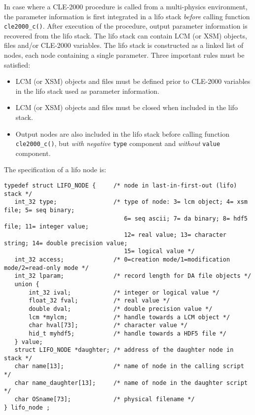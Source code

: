 \vskip 0.08cm

In case where a CLE-2000 procedure is called from a multi-physics environment, the parameter information is first integrated in a lifo stack {\sl before} calling
function {\tt cle2000\_c()}. After execution of the procedure, output parameter information is recovered from the lifo stack. The lifo stack can contain LCM (or XSM) objects, files and/or CLE-2000 variables. The lifo stack is constructed as a linked list of nodes, each node containing a single parameter. Three important rules must be satisfied:
\begin{itemize}
\item LCM (or XSM) objects and files must be defined prior to CLE-2000 variables in the lifo stack used as parameter information.
\item LCM (or XSM) objects and files must be closed when included in the lifo stack.
\item Output nodes are also included in the lifo stack before calling function {\tt cle2000\_c()}, but {\sl with negative} {\tt type} component and {\sl without} {\tt value} component.
\end{itemize}

\vskip 0.08cm

The specification of a lifo node is:

\small
\begin{verbatim}
typedef struct LIFO_NODE {     /* node in last-in-first-out (lifo) stack */
   int_32 type;                /* type of node: 3= lcm object; 4= xsm file; 5= seq binary;
                                  6= seq ascii; 7= da binary; 8= hdf5 file; 11= integer value;
                                  12= real value; 13= character string; 14= double precision value;
                                  15= logical value */
   int_32 access;              /* 0=creation mode/1=modification mode/2=read-only mode */
   int_32 lparam;              /* record length for DA file objects */
   union {
       int_32 ival;            /* integer or logical value */
       float_32 fval;          /* real value */
       double dval;            /* double precision value */
       lcm *mylcm;             /* handle towards a LCM object */
       char hval[73];          /* character value */
       hid_t myhdf5;           /* handle towards a HDF5 file */
   } value;
   struct LIFO_NODE *daughter; /* address of the daughter node in stack */
   char name[13];              /* name of node in the calling script */
   char name_daughter[13];     /* name of node in the daughter script */
   char OSname[73];            /* physical filename */
} lifo_node ;
\end{verbatim}
\normalsize

